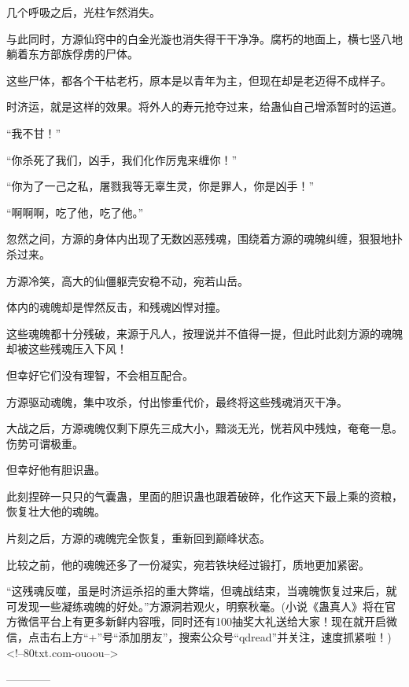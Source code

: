 \begin{this_body}
几个呼吸之后，光柱乍然消失。

与此同时，方源仙窍中的白金光漩也消失得干干净净。腐朽的地面上，横七竖八地躺着东方部族俘虏的尸体。

这些尸体，都各个干枯老朽，原本是以青年为主，但现在却是老迈得不成样子。

时济运，就是这样的效果。将外人的寿元抢夺过来，给蛊仙自己增添暂时的运道。

“我不甘！”

“你杀死了我们，凶手，我们化作厉鬼来缠你！”

“你为了一己之私，屠戮我等无辜生灵，你是罪人，你是凶手！”

“啊啊啊，吃了他，吃了他。”

忽然之间，方源的身体内出现了无数凶恶残魂，围绕着方源的魂魄纠缠，狠狠地扑杀过来。

方源冷笑，高大的仙僵躯壳安稳不动，宛若山岳。

体内的魂魄却是悍然反击，和残魂凶悍对撞。

这些魂魄都十分残破，来源于凡人，按理说并不值得一提，但此时此刻方源的魂魄却被这些残魂压入下风！

但幸好它们没有理智，不会相互配合。

方源驱动魂魄，集中攻杀，付出惨重代价，最终将这些残魂消灭干净。

大战之后，方源魂魄仅剩下原先三成大小，黯淡无光，恍若风中残烛，奄奄一息。伤势可谓极重。

但幸好他有胆识蛊。

此刻捏碎一只只的气囊蛊，里面的胆识蛊也跟着破碎，化作这天下最上乘的资粮，恢复壮大他的魂魄。

片刻之后，方源的魂魄完全恢复，重新回到巅峰状态。

比较之前，他的魂魄还多了一份凝实，宛若铁块经过锻打，质地更加紧密。

“这残魂反噬，虽是时济运杀招的重大弊端，但魂战结束，当魂魄恢复过来后，就可发现一些凝练魂魄的好处。”方源洞若观火，明察秋毫。(小说《蛊真人》将在官方微信平台上有更多新鲜内容哦，同时还有100抽奖大礼送给大家！现在就开启微信，点击右上方“+”号“添加朋友”，搜索公众号“qdread”并关注，速度抓紧啦！)<!--80txt.com-ouoou-->

------------

\end{this_body}

